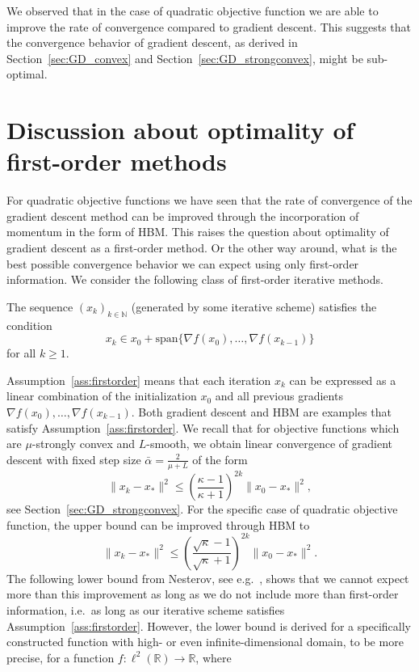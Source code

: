 \documentclass[12pt,openany]{book}
\theoremstyle{definition}
\theoremstyle{definition}
\newcommand{\N}{\mathbb{N}}
\newcommand{\R}{\mathbb{R}}
\begin{document}
\medskip
We observed that in the case of quadratic objective function we are able to improve the rate of convergence compared to gradient descent. This suggests that the convergence behavior of gradient descent, as derived in Section~\ref{sec:GD_convex} and Section~\ref{sec:GD_strongconvex}, might be sub-optimal. 

\section{Discussion about optimality of first-order methods}

For quadratic objective functions we have seen that the rate of convergence of the gradient descent method can be improved through the incorporation of momentum in the form of HBM. This raises the question about optimality of gradient descent as a first-order method. Or the other way around, what is the best possible convergence behavior we can expect using only first-order information.  We consider the following class of first-order iterative methods.
\begin{ass}\label{ass:firstorder}
The sequence $(x_k)_{k\in\N}$ (generated by some iterative scheme) satisfies the condition 
\[ x_k \in x_0 + {\mathrm{span}}\{\nabla f(x_0),\dots,\nabla f(x_{k-1})\}\]
for all $k\ge1$.
\end{ass}
Assumption~\ref{ass:firstorder} means that each iteration $x_k$ can be expressed as a linear combination of the initialization $x_0$ and all previous gradients $\nabla f(x_0),\dots,\nabla f(x_{k-1})$.  Both gradient descent and HBM are examples that satisfy Assumption~\ref{ass:firstorder}. We recall that for objective functions which are $\mu$-strongly convex and $L$-smooth, we obtain linear convergence of gradient descent with fixed step size $\bar \alpha = \frac{2}{\mu+L}$ of the form
\[\|x_k-x_\ast\|^2 \le \left(\frac{\kappa-1}{\kappa+1}\right)^{2k}\|x_0-x_\ast\|^2, \]
see Section~\ref{sec:GD_strongconvex}. For the specific case of quadratic objective function, the upper bound can be improved through HBM to 
\[ \|x_k-x_\ast\|^2 \le \left(\frac{\sqrt{\kappa}-1}{\sqrt{\kappa}+1}\right)^{2k}\|x_0-x_\ast\|^2.\]
The following lower bound from Nesterov, see e.g.~\cite{N2018}, shows that we cannot expect more than this improvement as long as we do not include more than first-order information, i.e.~as long as our iterative scheme satisfies Assumption~\ref{ass:firstorder}. However, the lower bound is derived for a specifically constructed function with high- or even infinite-dimensional domain, to be more precise, for a function $f:\ell^2(\R)\to\R$, where 
\end{document}
